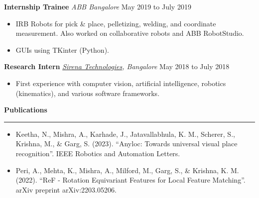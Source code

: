 \documentclass{article}
\newcommand{\newsec}[1]{
    {\bf \large #1}
    \vspace{2mm}
    \hrule
    \vspace{2mm}
}
\newcommand{\expheader}[3]{
    {\bf #1} \hfill {\it #2} \hfill #3
}
\begin{document}
    \expheader{Internship Trainee}{ABB Bangalore}{May 2019 to July 
        2019}
    \begin{itemize}
        \setlength{\itemsep}{0mm}
        \item IRB Robots for pick \& place, pelletizing, welding, and
            coordinate measurement. Also worked on collaborative
            robots and ABB RobotStudio.
        \item GUIs using TKinter (Python).
    \end{itemize}
    \expheader{Research Intern}{\href{https://sirenatech.com/}{Sirena
        Technologies}, Bangalore}{May 2018 to July 2018}
    \begin{itemize}
        \setlength{\itemsep}{0mm}
        \item First experience with computer vision, artificial 
            intelligence, robotics (kinematics), and various software 
            frameworks.
    \end{itemize}
    \newsec{Publications}
    \begin{itemize}
        \setlength{\itemsep}{0mm}
        \item Keetha, N., Mishra, A., Karhade, J., Jatavallabhula, K.
            M., Scherer, S., Krishna, M., \& Garg, S. (2023). 
            ``Anyloc: Towards universal visual place recognition''. 
            IEEE Robotics and Automation Letters.
        \item Peri, A., Mehta, K., Mishra, A., Milford, M., Garg, S., 
            \& Krishna, K. M. (2022). ``ReF - Rotation Equivariant 
            Features for Local Feature Matching''. arXiv preprint 
            arXiv:2203.05206.
    \end{itemize}
\end{document}
